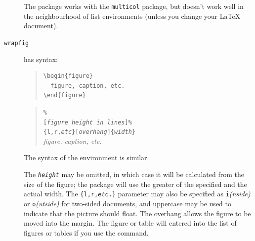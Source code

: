 \begin{description}
The package works with the \texttt{multicol} package, but doesn't work well
in the neighbourhood of list environments (unless you change your
\LaTeX{} document).
\item[\texttt{wrapfig}]  has syntax:
\begin{wideversion}
\begin{quote}
\begin{verbatim}
\begin{figure}
  figure, caption, etc.
\end{figure}
\end{verbatim}
\end{quote}
\end{wideversion}
\begin{narrowversion}
  \begin{quote}
  \texttt{\%}\\
  \mbox{}%
  \qquad\qquad\texttt{[\emph{figure height in lines}]\%}\\
  \mbox{}%
  \qquad\qquad\texttt{\{l,r,\emph{etc}\}[\emph{overhang}]\{\emph{width}\}}\\
  \mbox{}\qquad\emph{figure, caption, etc.}\\
  \end{quote}
\end{narrowversion}    
    The syntax of the  environment is similar.
    
    The \emph{\texttt{height}} may be omitted, in which case it will
    be calculated from the size of the figure; the package will use
    the greater of the specified and the
    actual width.  The \texttt{\{l,r,\emph{etc}.\}} parameter may
    also be specified as \texttt{i}\emph{(nside)} or
    \texttt{o}\emph{(utside)} for two-sided documents, and uppercase
    may be used to indicate that the picture should float.  The
    overhang allows the figure to be
    moved into the margin.  The figure or table will entered into the
    list of figures or tables if you use the  command.
    

\end{description}
